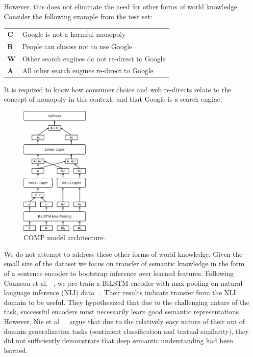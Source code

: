 \documentclass[11pt,a4paper]{article}
\begin{document}
However, this does not eliminate the need for other forms of world knowledge.
Consider the following example from the test set:

\vspace{8pt}

\begin{tabular}{p{}p{}}
  $\mathbf{C}$ & Google is not a harmful monopoly \\
  $\mathbf{R}$ & People can choose not to use Google \\
  $\mathbf{W}$ & Other search engines do not re-direct to Google \\
  $\mathbf{A}$ & All other search engines re-direct to Google \\
\end{tabular}

\vspace{8pt}

\noindent
It is required to know how consumer choice and web re-directs relate to the concept of monopoly in this context,
  and that Google is a search engine.

\begin{figure}[t]
\centering
           \includegraphics[width=0.3\textwidth]{Comp_Model.jpg}
\caption{
COMP model architecture.
}
\end{figure}

We do not attempt to address these other forms of world knowledge.
Given the small size of the dataset
  we focus on transfer of semantic knowledge in the form of a sentence encoder
  to bootstrap inference over learned features.
Following Conneau et al. ~, 
  we pre-train a BiLSTM encoder with max pooling on natural language inference (NLI) data 
    ~\cite{DBLP:journals/corr/WilliamsNB17, DBLP:journals/corr/BowmanAPM15}. 
Their results indicate transfer from the NLI domain to be useful. 
They hypothesized that due to the challenging nature of the task,
  successful encoders must necessarily learn good semantic representations.
However, Nie et al. ~ argue that
  due to the relatively easy nature of their out of domain generalization tasks 
  (sentiment classification and textual similarity),
  they did not sufficiently demonstrate that deep semantic understanding had been learned.
\end{document}
